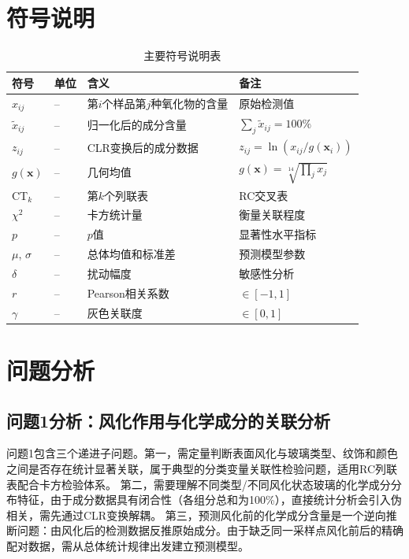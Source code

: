 \documentclass[12pt,a4paper]{ctexart}
\begin{document}
\newpage

\section{符号说明}

\begin{table}[H]
\centering
\caption{主要符号说明表}
\label{tab:symbols}
\begin{tabularx}{\textwidth}{p{2.5cm}p{1.8cm}p{6.5cm}Y}
\toprule
符号 & 单位 & 含义 & 备注 \\
\midrule
$x_{ij}$  & --  & 第$i$个样品第$j$种氧化物的含量 & 原始检测值 \\
$\tilde{x}_{ij}$ & -- & 归一化后的成分含量 & $\sum_j \tilde{x}_{ij}=100\%$ \\
$z_{ij}$  & --  & CLR变换后的成分数据 & $z_{ij}=\ln(x_{ij}/g(\mathbf{x}_i))$ \\
$g(\mathbf{x})$ & -- & 几何均值 & $g(\mathbf{x})=\sqrt[14]{\prod_j x_j}$ \\
CT$_k$ & -- & 第$k$个列联表 & RC交叉表 \\
$\chi^2$ & -- & 卡方统计量 & 衡量关联程度 \\
$p$ & -- & $p$值 & 显著性水平指标 \\
$\mu$, $\sigma$ & -- & 总体均值和标准差 & 预测模型参数 \\
$\delta$ & -- & 扰动幅度 & 敏感性分析 \\
$r$ & -- & Pearson相关系数 & $\in[-1,1]$ \\
$\gamma$ & -- & 灰色关联度 & $\in[0,1]$ \\
\bottomrule
\end{tabularx}
\end{table}

\newpage

\section{问题分析}

\subsection{问题1分析：风化作用与化学成分的关联分析}

问题1包含三个递进子问题。第一，需定量判断表面风化与玻璃类型、纹饰和颜色之间是否存在统计显著关联，属于典型的分类变量关联性检验问题，适用RC列联表配合卡方检验体系。
第二，需要理解不同类型/不同风化状态玻璃的化学成分分布特征，由于成分数据具有闭合性（各组分总和为100\%），直接统计分析会引入伪相关，需先通过CLR变换解耦\cite{2}。
第三，预测风化前的化学成分含量是一个逆向推断问题：由风化后的检测数据反推原始成分。由于缺乏同一采样点风化前后的精确配对数据，需从总体统计规律出发建立预测模型。
\end{document}

